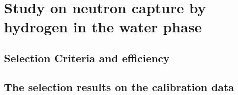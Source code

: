 \section{Study on neutron capture by hydrogen in the water phase}
\subsection{Selection Criteria and efficiency}

\subsection{The selection results on the   calibration data}